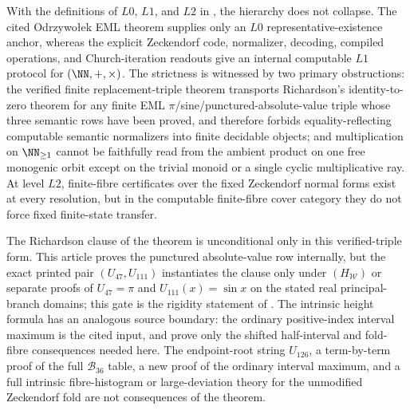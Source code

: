 \begin{theorem}\label{thm:main-hierarchy}
With the definitions of \(L0\), \(L1\), and \(L2\) in
, the hierarchy does not collapse.  The cited
Odrzywo{\l}ek EML theorem supplies only an \(L0\) representative-existence anchor,
whereas the explicit Zeckendorf code, normalizer, decoding, compiled operations,
and Church-iteration readouts give an internal computable \(L1\) protocol for
\((\NN,+,\times)\).  The strictness is witnessed by two primary
obstructions: the verified finite replacement-triple theorem transports
Richardson's identity-to-zero theorem for any finite EML
\(\pi\)/sine/punctured-absolute-value triple whose three semantic rows have been
proved, and therefore forbids equality-reflecting
computable semantic normalizers into finite decidable objects; and multiplication
on \(\NN_{\ge1}\) cannot be faithfully read from the ambient product on one free
monogenic orbit except on the trivial monoid or a single cyclic multiplicative ray.
At level \(L2\), finite-fibre certificates over the fixed Zeckendorf normal forms
exist at every resolution, but in the computable finite-fibre cover category they
do not force fixed finite-state transfer.

The Richardson clause of the theorem is unconditional only in this
verified-triple form.  This article proves the punctured absolute-value row
internally, but the exact printed pair \((U_{47},U_{111})\) instantiates the
clause only under \((H_{\mathcal W})\) or separate proofs of
\(U_{47}=\pi\) and \(U_{111}(x)=\sin x\) on the stated real principal-branch
domains; this gate is the rigidity statement of
.  The intrinsic height formula has an
analogous source boundary: the ordinary positive-index interval maximum is the
cited input, and
prove only the shifted half-interval and fold-fibre consequences needed here.
The endpoint-root string \(U_{126}\), a term-by-term proof of the full
\(\mathcal B_{36}\) table, a new proof of the ordinary interval maximum, and a
full intrinsic fibre-histogram or large-deviation theory for the unmodified
Zeckendorf fold are not consequences of the theorem.
\end{theorem}

